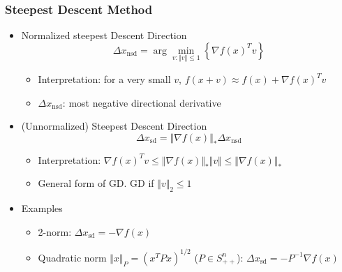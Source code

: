 \subsubsection*{Steepest Descent Method}
\begin{itemize}
    \item Normalized steepest Descent Direction
    \begin{equation}
        \Delta x_\mathrm{nsd}=\arg\min_{v:\Vert v\Vert\leq 1} \left\{\nabla f(x)^T v\right\}
    \end{equation}
    \begin{itemize}
        \item Interpretation: for a very small $v$, $f(x+v)\approx f(x)+\nabla f(x)^T v$
        \item $\Delta x_{\mathrm{nsd}}$: most negative directional derivative
    \end{itemize}
    \item (Unnormalized) Steepest Descent Direction
    \begin{equation}
        \Delta x_\mathrm{sd}=\Vert\nabla f(x)\Vert_\ast\Delta x_\mathrm{nsd}
    \end{equation}
    \begin{itemize}
        \item Interpretation: $\nabla f(x)^Tv\leq\Vert\nabla f(x)\Vert_\ast\Vert v\Vert\leq\Vert\nabla f(x)\Vert_\ast$
        \item General form of GD. GD if $\Vert v\Vert_2\leq 1$
    \end{itemize}
    \item Examples
    \begin{itemize}
        \item 2-norm: $\Delta x_\mathrm{sd} = -\nabla f(x)$
        \item Quadratic norm $\Vert x\Vert_P=(x^TPx)^{1/2}$ ($P\in S_{++}^n$): $\Delta x_\mathrm{sd}=-P^{-1}\nabla f(x)$
    \end{itemize}
\end{itemize}

